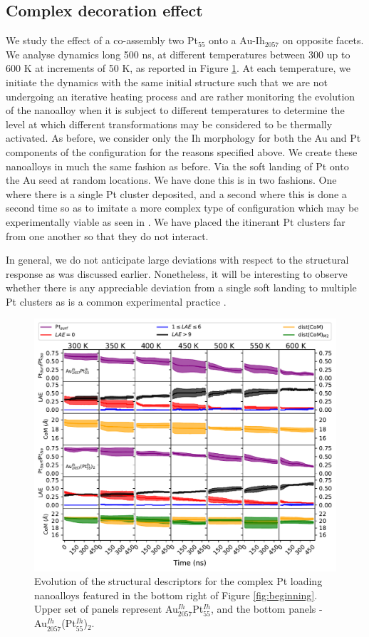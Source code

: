 \clearpage
\subsection{Complex decoration effect}

We study the effect of a co-assembly two Pt$_{55}$ onto a Au-Ih$_{2057}$ on opposite facets. We analyse dynamics long 500 ns, at different temperatures between 300 up to 600 K at increments of 50 K, as reported in Figure \ref{fig:micki}. At each temperature, we initiate the dynamics with the same initial structure such that we are not undergoing an iterative heating process and are rather monitoring the evolution of the nanoalloy when it is subject to different temperatures to determine the level at which different transformations may be considered to be thermally activated. As before, we consider only the Ih morphology for both the Au and Pt components of the configuration for the reasons specified above. We create these nanoalloys in much the same fashion as before. Via the soft landing of Pt onto the Au seed at random locations. We have done this is in two fashions. One where there is a single Pt cluster deposited, and a second where this is done a second time so as to imitate a more complex type of configuration which may be experimentally viable as seen in \cite{Jorge2019}. We have placed the itinerant Pt clusters far from one another so that they do not interact.

In general, we do not anticipate large deviations with respect to the structural response as was discussed earlier. Nonetheless, it will be interesting to observe whether there is any appreciable deviation from a single soft landing to multiple Pt clusters as is a common experimental practice \cite{JorgeStructure}.

\begin{figure}
\centering
    \includegraphics[width=\linewidth]{figures/MD/Coal/Micki.pdf}
    \caption{Evolution of the structural descriptors for the complex Pt loading nanoalloys featured in the bottom right of Figure \ref{fig:beginning}. Upper set of panels represent Au$_{2057}^{Ih}$Pt$_{55}^{Ih}$, and the bottom panels - Au$_{2057}^{Ih}$(Pt$_{55}^{Ih}$)$_{2}$.}
    \label{fig:micki}
\end{figure}


